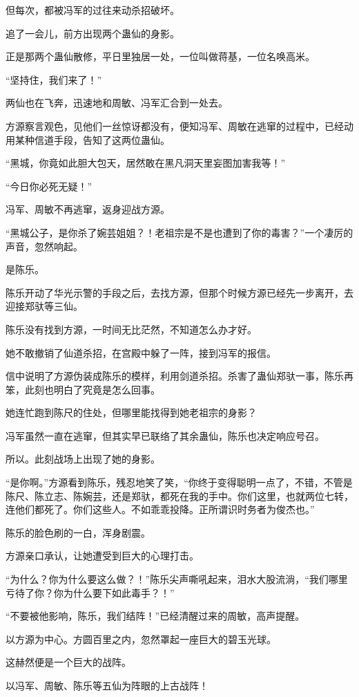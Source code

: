 \begin{this_body}
但每次，都被冯军的过往来动杀招破坏。

追了一会儿，前方出现两个蛊仙的身影。

正是那两个蛊仙散修，平日里独居一处，一位叫做蒋基，一位名唤高米。

“坚持住，我们来了！”

两仙也在飞奔，迅速地和周敏、冯军汇合到一处去。

方源察言观色，见他们一丝惊讶都没有，便知冯军、周敏在逃窜的过程中，已经动用某种信道手段，告知了这两位蛊仙。

“黑城，你竟如此胆大包天，居然敢在黑凡洞天里妄图加害我等！”

“今日你必死无疑！”

冯军、周敏不再逃窜，返身迎战方源。

“黑城公子，是你杀了婉芸姐姐？！老祖宗是不是也遭到了你的毒害？”一个凄厉的声音，忽然响起。

是陈乐。

陈乐开动了华光示警的手段之后，去找方源，但那个时候方源已经先一步离开，去迎接郑驮等三仙。

陈乐没有找到方源，一时间无比茫然，不知道怎么办才好。

她不敢撤销了仙道杀招，在宫殿中躲了一阵，接到冯军的报信。

信中说明了方源伪装成陈乐的模样，利用剑道杀招。杀害了蛊仙郑驮一事，陈乐再笨，此刻也明白了究竟是怎么回事。

她连忙跑到陈尺的住处，但哪里能找得到她老祖宗的身影？

冯军虽然一直在逃窜，但其实早已联络了其余蛊仙，陈乐也决定响应号召。

所以。此刻战场上出现了她的身影。

“是你啊。”方源看到陈乐，残忍地笑了笑，“你终于变得聪明一点了，不错，不管是陈尺、陈立志、陈婉芸，还是郑驮，都死在我的手中。你们这里，也就两位七转，连他们都死了。你们这些人。不如乖乖投降。正所谓识时务者为俊杰也。”

陈乐的脸色刷的一白，浑身剧震。

方源亲口承认，让她遭受到巨大的心理打击。

“为什么？你为什么要这么做？！”陈乐尖声嘶吼起来，泪水大股流淌，“我们哪里亏待了你？你为什么要下如此毒手？！”

“不要被他影响，陈乐，我们结阵！”已经清醒过来的周敏，高声提醒。

以方源为中心。方圆百里之内，忽然罩起一座巨大的碧玉光球。

这赫然便是一个巨大的战阵。

以冯军、周敏、陈乐等五仙为阵眼的上古战阵！


\end{this_body}
